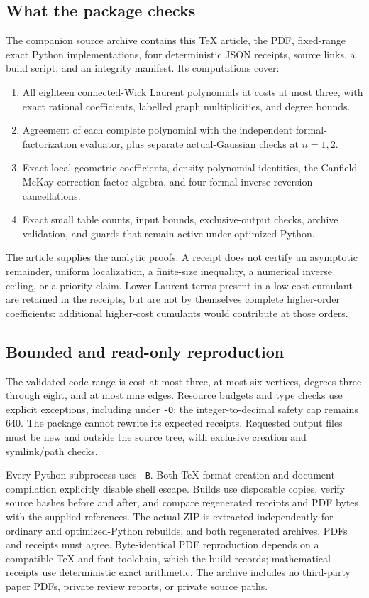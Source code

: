 \subsection{What the package checks}
The companion source archive contains this TeX article, the PDF, fixed-range exact Python implementations, four deterministic JSON receipts, source links, a build script, and an integrity manifest. Its computations cover:
\begin{enumerate}
\item All eighteen connected-Wick Laurent polynomials at costs at most three, with exact rational coefficients, labelled graph multiplicities, and degree bounds.
\item Agreement of each complete polynomial with the independent formal-factorization evaluator, plus separate actual-Gaussian checks at $n=1,2$.
\item Exact local geometric coefficients, density-polynomial identities, the Canfield--McKay correction-factor algebra, and four formal inverse-reversion cancellations.
\item Exact small table counts, input bounds, exclusive-output checks, archive validation, and guards that remain active under optimized Python.
\end{enumerate}
The article supplies the analytic proofs. A receipt does not certify an asymptotic remainder, uniform localization, a finite-size inequality, a numerical inverse ceiling, or a priority claim. Lower Laurent terms present in a low-cost cumulant are retained in the receipts, but are not by themselves complete higher-order coefficients: additional higher-cost cumulants would contribute at those orders.

\subsection{Bounded and read-only reproduction}
The validated code range is cost at most three, at most six vertices, degrees three through eight, and at most nine edges. Resource budgets and type checks use explicit exceptions, including under \texttt{-O}; the integer-to-decimal safety cap remains $640$. The package cannot rewrite its expected receipts. Requested output files must be new and outside the source tree, with exclusive creation and symlink/path checks.

Every Python subprocess uses \texttt{-B}. Both TeX format creation and document compilation explicitly disable shell escape. Builds use disposable copies, verify source hashes before and after, and compare regenerated receipts and PDF bytes with the supplied references. The actual ZIP is extracted independently for ordinary and optimized-Python rebuilds, and both regenerated archives, PDFs and receipts must agree. Byte-identical PDF reproduction depends on a compatible TeX and font toolchain, which the build records; mathematical receipts use deterministic exact arithmetic. The archive includes no third-party paper PDFs, private review reports, or private source paths.

